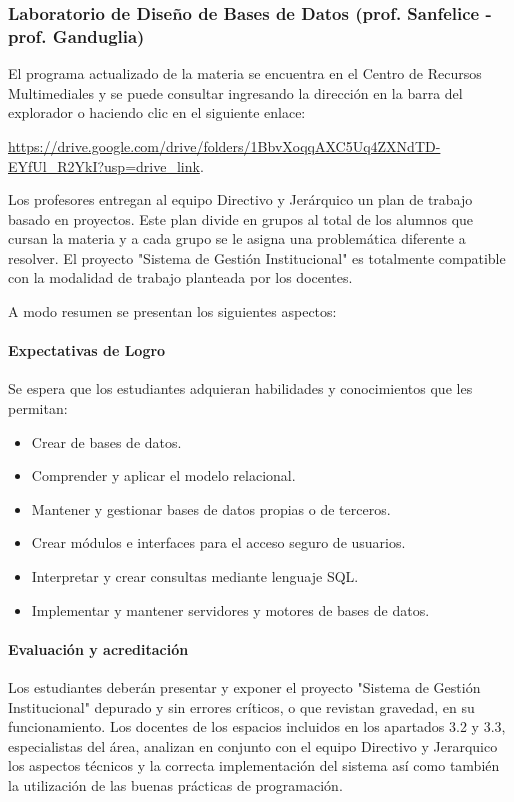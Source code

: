 
\subsubsection{Laboratorio de Diseño de Bases de Datos (prof. Sanfelice - prof. Ganduglia)} 

El programa actualizado de la materia se encuentra en el Centro de Recursos Multimediales y se puede consultar ingresando la dirección en la barra del explorador o haciendo clic en el siguiente enlace:

\url{https://drive.google.com/drive/folders/1BbvXoqqAXC5Uq4ZXNdTD-EYfUl_R2YkI?usp=drive_link}.

Los profesores entregan al equipo Directivo y Jerárquico un plan de trabajo basado en proyectos. Este plan divide en grupos al total de los alumnos que cursan la materia y a cada grupo se le asigna una problemática diferente a resolver. El proyecto "Sistema de Gestión Institucional" es totalmente compatible con la modalidad de trabajo planteada por los docentes.

A modo resumen se presentan los siguientes aspectos:
\paragraph{Expectativas de Logro}
Se espera que los estudiantes adquieran habilidades y conocimientos que les permitan: 

\begin{itemize}
    \item Crear de bases de datos.
    \item Comprender y aplicar el modelo relacional.
    \item Mantener y gestionar bases de datos propias o de terceros.
    \item Crear módulos e interfaces para el acceso seguro de usuarios.
    \item Interpretar y crear consultas mediante lenguaje SQL.
    \item Implementar y mantener servidores y motores de bases de datos. 
\end{itemize}

\paragraph{Evaluación y acreditación}

Los estudiantes deberán presentar y exponer el proyecto "Sistema de Gestión Institucional" depurado y sin errores críticos, o que revistan gravedad, en su funcionamiento. Los docentes de los espacios incluidos en los apartados 3.2 y 3.3, especialistas del área, analizan en conjunto con el equipo Directivo y Jerarquico los aspectos técnicos y la correcta implementación del sistema así como también la utilización de las buenas prácticas de programación.

